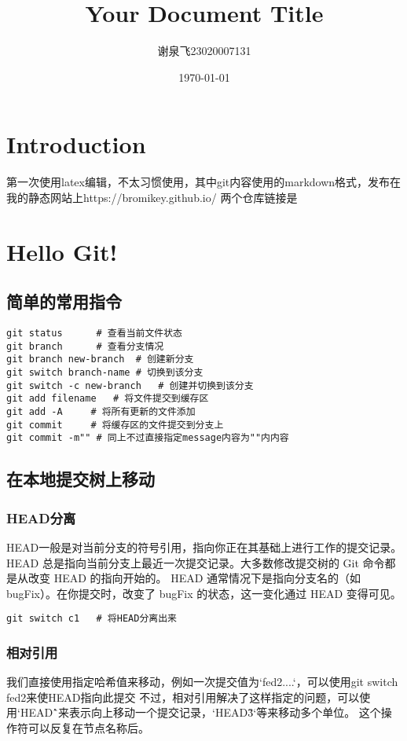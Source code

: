 \documentclass{article}
\begin{document}
	
	\title{Your Document Title}
	\author{谢泉飞23020007131}
	\date{\today} %
	\maketitle
	
	\tableofcontents
	\newpage
	
	
	\section{Introduction}
	第一次使用latex编辑，不太习惯使用，其中git内容使用的markdown格式，发布在我的静态网站上https://bromikey.github.io/
	两个仓库链接是
	
	
	\section{Hello Git!}
	\subsection{简单的常用指令}
		\begin{lstlisting}
git status      # 查看当前文件状态
git branch      # 查看分支情况
git branch new-branch  # 创建新分支
git switch branch-name # 切换到该分支
git switch -c new-branch   # 创建并切换到该分支
git add filename   # 将文件提交到缓存区
git add -A     # 将所有更新的文件添加
git commit     # 将缓存区的文件提交到分支上
git commit -m""	# 同上不过直接指定message内容为""内内容
		\end{lstlisting}
	\subsection{在本地提交树上移动}
		\subsubsection{HEAD分离}
			HEAD一般是对当前分支的符号引用，指向你正在其基础上进行工作的提交记录。HEAD 总是指向当前分支上最近一次提交记录。大多数修改提交树的 Git 命令都是从改变 HEAD 的指向开始的。
			HEAD 通常情况下是指向分支名的（如 bugFix）。在你提交时，改变了 bugFix 的状态，这一变化通过 HEAD 变得可见。
			\begin{lstlisting}
git switch c1	# 将HEAD分离出来
			\end{lstlisting}
		\subsubsection{相对引用}
			我们直接使用指定哈希值来移动，例如一次提交值为`fed2....`，可以使用git switch fed2来使HEAD指向此提交
			不过，相对引用解决了这样指定的问题，可以使用`HEAD\^`来表示向上移动一个提交记录，`HEAD\~3`等来移动多个单位。
			这个操作符可以反复在节点名称后。
			
\end{document}
